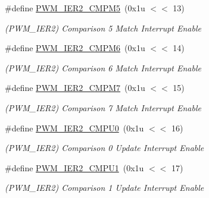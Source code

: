 \begin{DoxyCompactItemize}
\mbox{\label{group__SAMV71__PWM_gac85a721c9751d05ea064ca180b45d98a}} 
\#define \mbox{\hyperlink{group__SAMV71__PWM_gac85a721c9751d05ea064ca180b45d98a}{P\+W\+M\+\_\+\+I\+E\+R2\+\_\+\+C\+M\+P\+M5}}~(0x1u $<$$<$ 13)
\begin{DoxyCompactList}\small\item\em (P\+W\+M\+\_\+\+I\+E\+R2) Comparison 5 Match Interrupt Enable \end{DoxyCompactList}\item 
\mbox{\label{group__SAMV71__PWM_ga5a109538ada1094ded88aa1e09d0aca6}} 
\#define \mbox{\hyperlink{group__SAMV71__PWM_ga5a109538ada1094ded88aa1e09d0aca6}{P\+W\+M\+\_\+\+I\+E\+R2\+\_\+\+C\+M\+P\+M6}}~(0x1u $<$$<$ 14)
\begin{DoxyCompactList}\small\item\em (P\+W\+M\+\_\+\+I\+E\+R2) Comparison 6 Match Interrupt Enable \end{DoxyCompactList}\item 
\mbox{\label{group__SAMV71__PWM_gaa9a7c0c83f409e3d87e205bc17d3c5e5}} 
\#define \mbox{\hyperlink{group__SAMV71__PWM_gaa9a7c0c83f409e3d87e205bc17d3c5e5}{P\+W\+M\+\_\+\+I\+E\+R2\+\_\+\+C\+M\+P\+M7}}~(0x1u $<$$<$ 15)
\begin{DoxyCompactList}\small\item\em (P\+W\+M\+\_\+\+I\+E\+R2) Comparison 7 Match Interrupt Enable \end{DoxyCompactList}\item 
\mbox{\label{group__SAMV71__PWM_gaf396a39569076b54e9a66a796b9d293d}} 
\#define \mbox{\hyperlink{group__SAMV71__PWM_gaf396a39569076b54e9a66a796b9d293d}{P\+W\+M\+\_\+\+I\+E\+R2\+\_\+\+C\+M\+P\+U0}}~(0x1u $<$$<$ 16)
\begin{DoxyCompactList}\small\item\em (P\+W\+M\+\_\+\+I\+E\+R2) Comparison 0 Update Interrupt Enable \end{DoxyCompactList}\item 
\mbox{\label{group__SAMV71__PWM_ga9967f725c1d96722b8fad64a5f64aa5f}} 
\#define \mbox{\hyperlink{group__SAMV71__PWM_ga9967f725c1d96722b8fad64a5f64aa5f}{P\+W\+M\+\_\+\+I\+E\+R2\+\_\+\+C\+M\+P\+U1}}~(0x1u $<$$<$ 17)
\begin{DoxyCompactList}\small\item\em (P\+W\+M\+\_\+\+I\+E\+R2) Comparison 1 Update Interrupt Enable \end{DoxyCompactList}\item 
$$
\end{DoxyCompactItemize}
